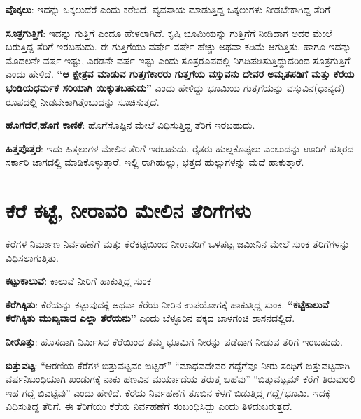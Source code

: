 \textbf{ವೊಕ್ಕಲು}: ಇದನ್ನು ಒಕ್ಕಲುದೆರೆ ಎಂದು ಕರೆದಿದೆ. ವ್ಯವಸಾಯ ಮಾಡುತ್ತಿದ್ದ ಒಕ್ಕಲುಗಳು ನೀಡಬೇಕಾಗಿದ್ದ ತೆರಿಗೆ

\textbf{ಸೂತ್ರಗುತ್ತಿಗೆ}: ಇದನ್ನು ಗುತ್ತಿಗೆ ಎಂದೂ ಹೇಳಲಾಗಿದೆ. ಕೃಷಿ ಭೂಮಿಯನ್ನು ಗುತ್ತಿಗೆಗೆ ನೀಡಿದಾಗ ಅದರ ಮೇಲೆ ಬರುತ್ತಿದ್ದ ತೆರಿಗೆ ಇರಬಹುದು. ಈ ಗುತ್ತಿಗೆಯು ವರ್ಷೇ ವರ್ಷೇ ಹೆಚ್ಚು ಅಥವಾ ಕಡಿಮೆ ಆಗುತ್ತಿತು. ಹಾಗೂ ಇದನ್ನು ಮೊದಲನೇ ವರ್ಷ ಇಷ್ಟು, ಎರಡನೇ ವರ್ಷ ಇಷ್ಟು ಎಂದು ಸೂತ್ರರೂಪದಲ್ಲಿ ನಿಗದಿಪಡಿಸುತ್ತಿದ್ದುದರಿಂದ ಸೂತ್ರಗುತ್ತಿಗೆ ಎಂದು ಹೇಳಿದೆ.\textbf{ “ಆ ಕ್ಷೇತ್ರವ ಮಾಡುವ ಗುತ್ತಗೆಕಾರರು ಗುತ್ತಗೆಯ ವಸ್ತುವನು ದೇವರ ಅಮೃತಪಡಿಗೆ ಮತ್ತು ಕೆರೆಯ ಭಂಡಿಯಧರ್ಮಕೆ ಸರಿಯಾಗಿ ಯಿಕ್ಕುತಬಹುದು” }ಎಂದು ಹೇಳಿದ್ದು ಭೂಮಿಯ ಗುತ್ತಗೆಯನ್ನು ವಸ್ತುವಿನ(ಧಾನ್ಯದ) ರೂಪದಲ್ಲಿ ನೀಡಬೇಕಾಗಿತ್ತೆಂಬುದನ್ನು ಸೂಚಿಸುತ್ತದೆ.

\textbf{ಹೊಗೆದೆರೆ},\textbf{ಹೊಗೆ ಕಾಣಿಕೆ}: ಹೊಗೆಸೊಪ್ಪಿನ ಮೇಲೆ ವಿಧಿಸುತ್ತಿದ್ದ ತೆರಿಗೆ ಇರಬಹುದು.

\textbf{ಹಿತ್ತಪೊತ್ತರ}: ಇದು ಹಿತ್ತಲುಗಳ ಮೇಲಿನ ತೆರಿಗೆ ಇರಬಹುದು. ರೈತರು ಹುಲ್ಲಕೊಪ್ಪಲು ಎಂಬುದನ್ನು ಊರಿಗೆ ಹತ್ತಿರದ ಸರ್ಕಾರಿ ಜಾಗದಲ್ಲಿ ಮಾಡಿಕೊಳ್ಳುತ್ತಾರೆ. ಇಲ್ಲಿ ರಾಗಿಹುಲ್ಲು, ಭತ್ತದ ಹುಲ್ಲುಗಳನ್ನು ಮೆದೆ ಹಾಕುತ್ತಾರೆ.


\section{ಕೆರೆ ಕಟ್ಟೆ, ನೀರಾವರಿ ಮೇಲಿನ ತೆರಿಗೆಗಳು}

ಕೆರೆಗಳ ನಿರ್ಮಾಣ ನಿರ್ವಹಣೆಗೆ ಮತ್ತು ಕೆರೆಕಟ್ಟೆಯಿಂದ ನೀರಾವರಿಗೆ ಒಳಪಟ್ಟ ಜಮೀನಿನ ಮೇಲೆ ಸುಂಕ ತೆರಿಗೆಗಳನ್ನು ವಿಧಿಸಲಾಗುತ್ತಿತು.

\textbf{ಕಟ್ಟುಕಾಲುವೆ}: ಕಾಲುವೆ ನೀರಿಗೆ ಹಾಕುತ್ತಿದ್ದ ಸುಂಕ

\textbf{ಕೆರೆಗಿಕ್ಕಿತು}: ಕೆರೆಯನ್ನು ಕಟ್ಟುವುದಕ್ಕೆ ಅಥವಾ ಕೆರೆಯ ನೀರಿನ ಉಪಯೋಗಕ್ಕೆ ಹಾಕುತ್ತಿದ್ದ ಸುಂಕ. \textbf{“ಕಟ್ಟೆಕಾಲುವೆ ಕೆರೆಗಿಕ್ಕಿತು ಮುಖ್ಯವಾದ ಎಲ್ಲಾ ತೆರೆಯನು”} ಎಂದು ಬೆಳ್ಳೂರಿನ ಪಕ್ಕದ ಬಾಳಗಂಚಿ ಶಾಸನದಲ್ಲಿದೆ.

\textbf{ನೀರೊತ್ತು}: ಹೊಸದಾಗಿ ನಿರ್ಮಿಸಿದ ಕೆರೆಯಿಂದ ತಮ್ಮ ಭೂಮಿಗೆ ನೀರನ್ನು ಪಡೆದಾಗ ನೀಡುವ ತೆರಿಗೆ ಇರಬಹುದು.

\textbf{ಬಿತ್ತುವಟ್ಟ}: “ಆರಣಿಯ ಕೆರೆಗಳ ಬಿತ್ತುವಟ್ಟವಂ ಬಿಟ್ಟರ್​” “ಮಾಧವದೇವರ ಗದ್ದೆಗೆವೂ ನೀರು ಸಂಧಿಗೆ ಬಿತ್ತುವಟ್ಟವಾಗಿ ವರ್ಷನಿಬಂಧಿಯಾಗಿ ಖಂಡುಗಕ್ಕೆ ನಾಕು ಹಣವಿನ ಮರ್ಯಾದೆಯ ತೆರುತ್ತ ಬಹೆವು” “ಬಿತ್ತುವಟ್ಟಮ್ ಕೆರೆಗೆ ತಿರುವುರಲಿ ಇಹ ಗದ್ದೆ ಬಿಎಟ್ಟೆವು” ಎಂದು ಹೇಳಿದೆ. ಕೆರೆಯ ನಿರ್ವಹಣೆಗೆ ತೂಬಿನ ಕೆಳಗೆ ಬಿಡುತ್ತಿದ್ದ ಗದ್ದೆ/ಭೂಮಿ. ಇದಕ್ಕೆ ವಿಧಿಸುತಿದ್ದ ತೆರಿಗೆ. ಈ ತೆರಿಗೆಯು ಕೆರೆಯ ನಿರ್ವಹಣೆಗೆ ಸಂಬಂಧಿಸಿದ್ದು ಎಂದು ತಿಳಿದುಬರುತ್ತದೆ.

